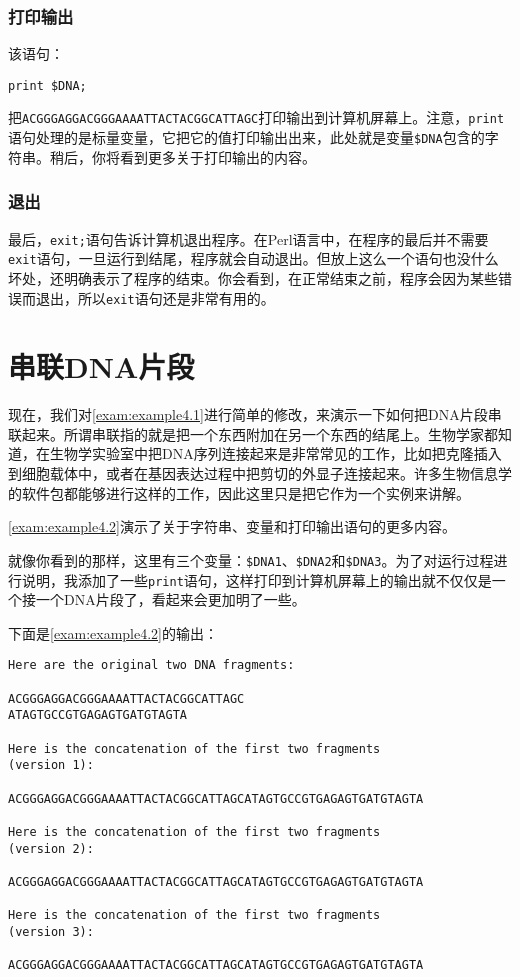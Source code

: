 \subsubsection{打印输出}
该语句：

\begin{lstlisting}
print $DNA;
\end{lstlisting}
把\verb|ACGGGAGGACGGGAAAATTACTACGGCATTAGC|打印输出到计算机屏幕上。注意，\verb|print|语句处理的是标量变量，它把它的值打印输出出来，此处就是变量\verb|$DNA|包含的字符串。稍后，你将看到更多关于打印输出的内容。

\subsubsection{退出}
最后，\verb|exit;|语句告诉计算机退出程序。在Perl语言中，在程序的最后并不需要\verb|exit|语句，一旦运行到结尾，程序就会自动退出。但放上这么一个语句也没什么坏处，还明确表示了程序的结束。你会看到，在正常结束之前，程序会因为某些错误而退出，所以\verb|exit|语句还是非常有用的。

\section{串联DNA片段}
现在，我们对\autoref{exam:example4.1}进行简单的修改，来演示一下如何把DNA片段串联起来。所谓串联指的就是把一个东西附加在另一个东西的结尾上。生物学家都知道，在生物学实验室中把DNA序列连接起来是非常常见的工作，比如把克隆插入到细胞载体中，或者在基因表达过程中把剪切的外显子连接起来。许多生物信息学的软件包都能够进行这样的工作，因此这里只是把它作为一个实例来讲解。

\autoref{exam:example4.2}演示了关于字符串、变量和打印输出语句的更多内容。



就像你看到的那样，这里有三个变量：\verb|$DNA1|、\verb|$DNA2|和\verb|$DNA3|。为了对运行过程进行说明，我添加了一些\verb|print|语句，这样打印到计算机屏幕上的输出就不仅仅是一个接一个DNA片段了，看起来会更加明了一些。

下面是\autoref{exam:example4.2}的输出：

\begin{lstlisting}
Here are the original two DNA fragments:

ACGGGAGGACGGGAAAATTACTACGGCATTAGC
ATAGTGCCGTGAGAGTGATGTAGTA

Here is the concatenation of the first two fragments
(version 1):

ACGGGAGGACGGGAAAATTACTACGGCATTAGCATAGTGCCGTGAGAGTGATGTAGTA

Here is the concatenation of the first two fragments
(version 2):

ACGGGAGGACGGGAAAATTACTACGGCATTAGCATAGTGCCGTGAGAGTGATGTAGTA

Here is the concatenation of the first two fragments
(version 3):

ACGGGAGGACGGGAAAATTACTACGGCATTAGCATAGTGCCGTGAGAGTGATGTAGTA
\end{lstlisting}

